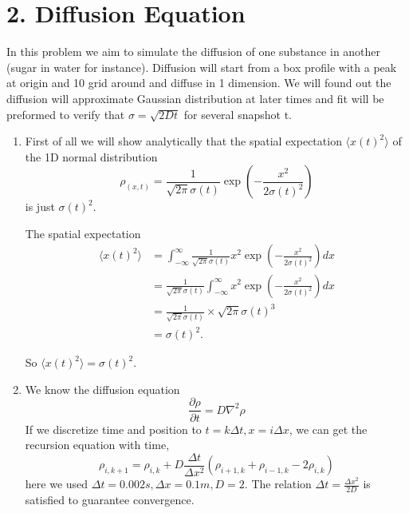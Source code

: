 \documentclass[aps,prl,preprint,superscriptaddress]{revtex4}
\begin{document}
	
	\section{2. Diffusion Equation}
	In this problem we aim to simulate the diffusion of one substance in another (sugar in water for instance). Diffusion will start from a box profile with a peak at origin and 10 grid around and diffuse in 1 dimension. We will found out the diffusion will approximate Gaussian distribution at later times and fit will be preformed to verify that $\sigma=\sqrt{2Dt}$ for several snapshot t.

\begin{enumerate}
\item First of all we will show analytically that the spatial expectation $\langle x(t)^2\rangle$ of the 1D normal distribution 
\begin{equation}
\rho_{(x,t)}=\frac{1}{\sqrt{2\pi}\sigma{(t)}}\exp(-\frac{x^2}{2\sigma{(t)}^2})
\end{equation}
is just $\sigma(t)^2$.

The spatial expectation
\begin{equation}
\begin{split}
\langle x(t)^2\rangle&=\int_{-\infty}^{\infty}\frac{1}{\sqrt{2\pi}\sigma(t)}x^2\exp(-\frac{x^2}{2\sigma(t)^2})dx\\
&=\frac{1}{\sqrt{2\pi}\sigma(t)}\int_{-\infty}^{\infty}x^2\exp(-\frac{x^2}{2\sigma(t)^2})dx\\
&=\frac{1}{\sqrt{2\pi}\sigma(t)}\times \sqrt{2\pi}\sigma(t)^3\\
&=\sigma(t)^2.
\end{split}
\end{equation}

So $\langle x(t)^2\rangle=\sigma(t)^2$.
\item We know the diffusion equation
\begin{equation}
\frac{\partial\rho}{\partial t}=D\nabla^2\rho
\end{equation}
If we discretize time and position to $t=k\Delta t, x=i\Delta x$, we can get the recursion equation with time, 
\begin{equation}
\rho_{i,k+1}=\rho_{i,k}+D\frac{\Delta t}{\Delta x^2}(\rho_{i+1,k}+\rho_{i-1,k}-2\rho_{i,k})
\end{equation}
here we used $\Delta t=0.002s, \Delta x=0.1m, D=2$. The relation $\Delta t=\frac{\Delta x^2}{2D}$ is satisfied to guarantee convergence.

\end{enumerate}
\end{document}
